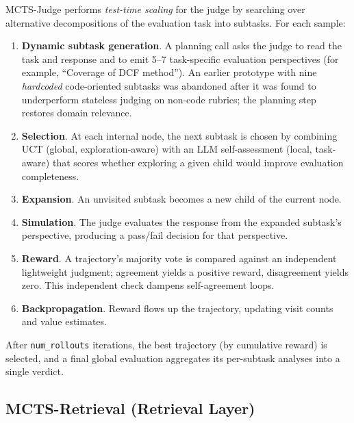 \documentclass[12pt,a4paper]{report}
\begin{document}
MCTS-Judge performs \textit{test-time scaling} for the judge by searching over alternative decompositions of the evaluation task into subtasks. For each sample:
\begin{enumerate}
    \item \textbf{Dynamic subtask generation}. A planning call asks the judge to read the task and response and to emit 5--7 task-specific evaluation perspectives (for example, ``Coverage of DCF method''). An earlier prototype with nine \textit{hardcoded} code-oriented subtasks was abandoned after it was found to underperform stateless judging on non-code rubrics; the planning step restores domain relevance.
    \item \textbf{Selection}. At each internal node, the next subtask is chosen by combining UCT (global, exploration-aware) with an LLM self-assessment (local, task-aware) that scores whether exploring a given child would improve evaluation completeness.
    \item \textbf{Expansion}. An unvisited subtask becomes a new child of the current node.
    \item \textbf{Simulation}. The judge evaluates the response from the expanded subtask's perspective, producing a pass/fail decision for that perspective.
    \item \textbf{Reward}. A trajectory's majority vote is compared against an independent lightweight judgment; agreement yields a positive reward, disagreement yields zero. This independent check dampens self-agreement loops.
    \item \textbf{Backpropagation}. Reward flows up the trajectory, updating visit counts and value estimates.
\end{enumerate}
After \texttt{num\_rollouts} iterations, the best trajectory (by cumulative reward) is selected, and a final global evaluation aggregates its per-subtask analyses into a single verdict.

\subsection{MCTS-Retrieval (Retrieval Layer)}
\end{document}
